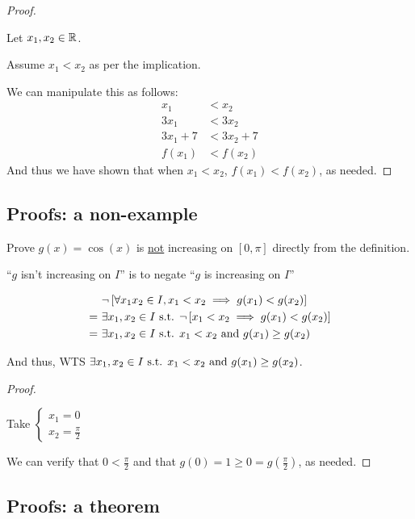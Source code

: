 \begin{proof} \(\)

  Let \(x_{1}, x_{2} \in \mathbb{R}\).

  Assume \(x_{1} < x_{2}\) as per the implication.

  We can manipulate this as follows:
  \begin{align*}
    x_{1} &< x_{2} \\
    3x_{1} &< 3x_{2} \\
    3x_{1} + 7 &< 3x_{2} + 7 \\
    f(x_{1}) &< f(x_{2})
  \end{align*}
  And thus we have shown that when \(x_{1} < x_{2}\), \(f(x_{1}) < f(x_{2})\), as needed. \qedhere
\end{proof}

\subsection{Proofs: a non-example}

Prove \(g(x) = \cos(x)\) is \underline{not} increasing on \([0, \pi]\) directly from the definition.

``\(g\) isn't increasing on \(I\)'' is to negate ``\(g\) is increasing on \(I\)''

\begin{align*}
  &~\neg\left[\forall x_{1} x_{2} \in I, x_{1} < x_{2} \implies g(x_{1}) < g(x_{2})\right] \\
  =&~\exists x_{1}, x_{2} \in I \text{ s.t. } \neg\left[x_{1} < x_{2} \implies g(x_{1}) < g(x_{2})\right] \\
  =&~\exists x_{1}, x_{2} \in I \text{ s.t. } x_{1} < x_{2} \text{ and } g(x_{1}) \geq g(x_{2}) \\
\end{align*}

And thus, WTS \(\exists x_{1}, x_{2} \in I \text{ s.t. } x_{1} < x_{2} \text{ and } g(x_{1}) \geq g(x_{2})\).

\begin{proof} \(\)

  Take \(\begin{cases} x_{1} = 0 \\ x_{2} = \frac{\pi}{2} \end{cases}\)

  We can verify that \(0 < \frac{\pi}{2}\) and that \(g(0) = 1 \geq 0 = g(\frac{\pi}{2})\), as needed. \qedhere
\end{proof}

\subsection{Proofs: a theorem}

